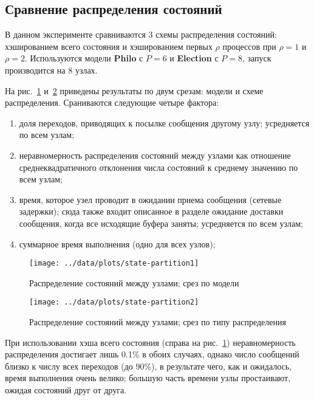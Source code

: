 \documentclass[12pt,a4paper,fleqn]{article}
\newcommand{\Code}[1]{\textbf{\mbox{#1}}}
\begin{document}
\subsection{Сравнение распределения состояний}

В данном эксперименте сравниваются 3 схемы распределения состояний: хэшированием всего состояния и
хэшированием первых $\rho$ процессов при $\rho = 1$ и $\rho = 2$. Используются модели \Code{Philo} с
$P = 6$ и \Code{Election} с $P = 8$, запуск производится на 8 узлах.

На рис.~\ref{fig:state-partition1} и~\ref{fig:state-partition2} приведены результаты по двум срезам:
модели и схеме распределения. Сраниваются следующие четыре фактора:
\begin{enumerate}
\item доля переходов, приводящих к посылке сообщения другому узлу; усредняется по всем узлам;
\item неравномерность распределения состояний между узлами как отношение среднеквадратичного
  отклонения числа состояний к среднему значению по всем узлам;
\item время, которое узел проводит в ожидании приема сообщения (сетевые задержки); сюда также входит
  описанное в разделе ожидание доставки сообщения, когда все исходящие буфера заняты; усредняется по
  всем узлам;
\item суммарное время выполнения (одно для всех узлов);
\end{enumerate}

\begin{figure}[p]
  \centering
  \texttt{[image: ../data/plots/state-partition1]}
  \caption{Распределение состояний между узлами; срез по модели}
  \label{fig:state-partition1}
\end{figure}

\begin{figure}[p]
  \centering
  \texttt{[image: ../data/plots/state-partition2]}
  \caption{Распределение состояний между узлами; срез по типу распределения}
  \label{fig:state-partition2}
\end{figure}

При использовании хэша всего состояния (справа на рис.~\ref{fig:state-partition1}) неравномерность
распределения достигает лишь 0.1\% в обоих случаях, однако число сообщений близко к числу всех
переходов (до 90\%), в результате чего, как и ожидалось, время выполнения очень велико; большую
часть времени узлы простаивают, ожидая состояний друг от друга.
\end{document}
